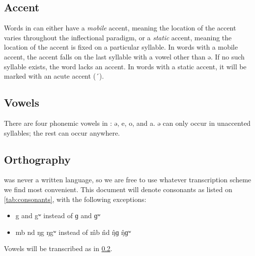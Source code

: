 \subsection{Accent}
Words in \Langname{} can either have a \emph{mobile} accent, meaning the
location of the accent varies throughout the inflectional paradigm, or a
\emph{static} accent, meaning the location of the accent is fixed on a
particular syllable. In words with a mobile accent, the accent falls on the
last syllable with a vowel other than {\ll ə}. If no such syllable exists, the
word lacks an accent. In words with a static accent, it will be marked with an
acute accent (´).

\subsection{Vowels}
\label{sec:vowels}
There are four phonemic vowels in \Langname{}: {\ll ə}, {\ll e}, {\ll o}, and
{\ll a}. {\ll ə} can only occur in unaccented syllables; the rest can occur
anywhere.

\subsection{Orthography}
\Langname{} was never a written language, so we are free to use whatever
transcription scheme we find most convenient. This document will denote
consonants as listed on \cref{tab:consonants}, with the following exceptions:
\begin{itemize}
    \item {\ll g} and {\ll gʷ} instead of ɡ and ɡʷ
    \item {\ll mb nd ŋg ŋgʷ} instead of \^mb \^nd \^ŋɡ \^ŋɡʷ
\end{itemize}
Vowels will be transcribed as in \cref{sec:vowels}.

